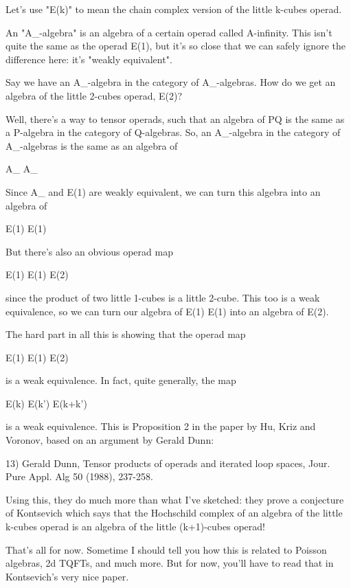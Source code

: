 Let's use "E(k)" to mean the chain complex version of the little 
k-cubes operad.  

An "A_{\infty }-algebra" is an algebra of a certain
operad called A-infinity.  This isn't quite the same as the operad
E(1), but it's so close that we can safely ignore the difference here:
it's "weakly equivalent".

Say we have an A_{\infty }-algebra in the category of A_{\infty }-algebras.  How do we get an algebra of the little 2-cubes operad,
E(2)?

Well, there's a way to tensor operads, such that an algebra of P\otimes Q 
is the same as a P-algebra in the category of Q-algebras.  So, an 
A_{\infty }-algebra in the category of A_{\infty }-algebras is
the same as an algebra of

A_{\infty } \otimes  A_{\infty }

Since A_{\infty } and E(1) are weakly equivalent, we can turn this
algebra into an algebra of 

E(1) \otimes  E(1)

But there's also an obvious operad map

E(1) \otimes  E(1) \to  E(2)

since the product of two little 1-cubes is a little 2-cube.
This too is a weak equivalence, so we can turn our algebra of
E(1) \otimes  E(1) into an algebra of E(2).

The hard part in all this is showing that the operad map

E(1) \otimes  E(1) \to  E(2)

is a weak equivalence.  In fact, quite generally, the map

E(k) \otimes  E(k') \to  E(k+k') 

is a weak equivalence.  This is Proposition 2 in the paper by
Hu, Kriz and Voronov, based on an argument by Gerald Dunn:

13) Gerald Dunn, Tensor products of operads and iterated loop
spaces, Jour. Pure Appl. Alg 50 (1988), 237-258.

Using this, they do much more than what I've sketched: they
prove a conjecture of Kontsevich which says that the Hochschild 
complex of an algebra of the little k-cubes
operad is an algebra of the little (k+1)-cubes operad!

That's all for now.  Sometime I should tell you how this is related
to Poisson algebras, 2d TQFTs, and much more.  But for now, you'll
have to read that in Kontsevich's very nice paper.

